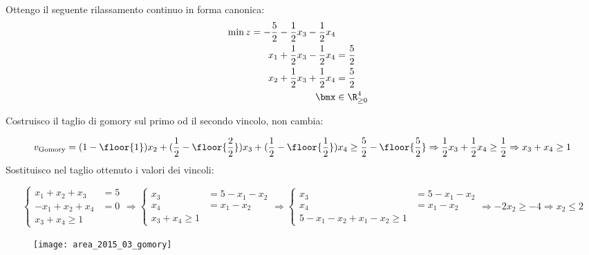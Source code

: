 \documentclass[\main/main.tex]{subfiles}
\begin{document}
Ottengo il seguente rilassamento continuo in forma canonica:
\begin{align*}
  \min z = -\frac{5}{2}-\frac{1}{2} x_3 -\frac{1}{2} x_4    \\
  x_1 + \frac{1}{2}x_3 - \frac{1}{2}x_4 & = \frac{5}{2}     \\
  x_2 + \frac{1}{2}x_3 + \frac{1}{2}x_4 & = \frac{5}{2}     \\
  \bmx                                  & \in \R^4_{\geq 0}
\end{align*}

Costruisco il taglio di gomory sul primo od il secondo vincolo, non cambia:

\[
  v_{\text{Gomory}} = (1-\floor{1})x_2 + (\frac{1}{2} - \floor{\frac{2}{2}})x_3 + (\frac{1}{2} - \floor{\frac{1}{2}})x_4 \geq \frac{5}{2} - \floor{\frac{5}{2}} \Rightarrow \frac{1}{2}x_3 + \frac{1}{2}x_4 \geq \frac{1}{2} \Rightarrow x_3 + x_4 \geq 1
\]
Sostituisco nel taglio ottenuto i valori dei vincoli:

\[
  \begin{cases}
    x_1 + x_2  + x_3 & = 5 \\
    -x_1 + x_2 +x_4  & = 0 \\
    x_3 + x_4 \geq 1
  \end{cases}
  \Rightarrow
  \begin{cases}
    x_3 & = 5 - x_1 - x_2 \\
    x_4 & = x_1 - x_2     \\
    x_3 + x_4 \geq 1
  \end{cases}
  \Rightarrow
  \begin{cases}
    x_3 & = 5 - x_1 - x_2 \\
    x_4 & = x_1 - x_2     \\
    5 - x_1 - x_2 +  x_1 - x_2 \geq 1
  \end{cases}
  \Rightarrow
  - 2x_2  \geq -4
  \Rightarrow
  x_2 \leq 2
\]

\begin{figure}
  \texttt{[image: area\_2015\_03\_gomory]}
\end{figure}
\end{document}
